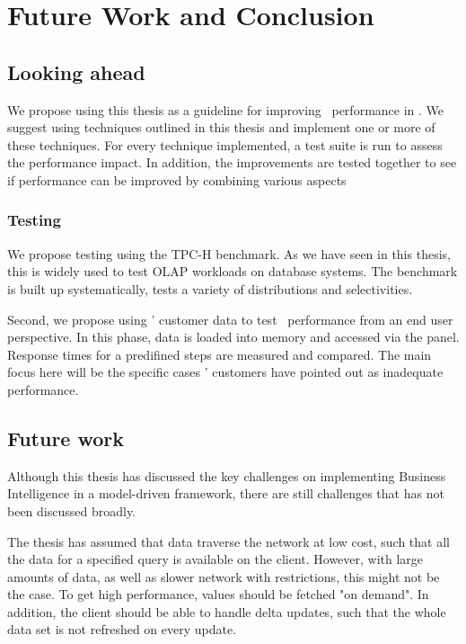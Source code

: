 \chapter{Future Work and Conclusion}
\label{chap:Future Work and Conclusion}

\section{Looking ahead}
\label{sub:Looking ahead}
We propose using this thesis as a guideline for improving \bd~performance in \genusSoftware. We suggest using techniques outlined in this thesis and implement one or more of these techniques. For every technique implemented, a test suite is run to assess the performance impact. In addition, the improvements are tested together to see if performance can be improved by combining various aspects

\subsection{Testing}
\label{sub:Testing}
We propose testing using the TPC-H benchmark. As we have seen in this thesis, this is widely used to test OLAP workloads on database systems. The benchmark is built up systematically, tests a variety of distributions and selectivities.

Second, we propose using \genus' customer data to test \bd~performance from an end user perspective. In this phase, data is loaded into memory and accessed via the panel. Response times for a predifined steps are measured and compared. The main focus here will be the specific cases \genus' customers have pointed out as inadequate performance.

\section{Future work}
Although this thesis has discussed the key challenges on implementing Business Intelligence in a model-driven framework, there are still challenges that has not been discussed broadly.

The thesis has assumed that data traverse the network at low cost, such that all the data for a specified query is available on the client. However, with large amounts of data, as well as slower network with restrictions, this might not be the case. To get high performance, values should be fetched "on demand". In addition, the client should be able to handle delta updates, such that the whole data set is not refreshed on every update.

